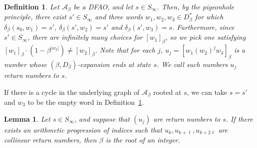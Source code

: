 \documentclass{amsart}
\newcommand{\Z}{\mathbb{Z}}
\newcommand{\tcr}{\textcolor{red}}
\newcommand{\ii}{\mathrm{i}}
\newtheorem*{main theorem}{Theorem \ref{thm:main-gaussian}}
\newtheorem{lemma}[theorem]{Lemma}
\newtheorem{definition}[theorem]{Definition}
\theoremstyle{definition}
\begin{document}
   \begin{definition}\label{def:return-number} Let $\mathcal A_\beta $ be a DFAO, and  let $s\in S_\infty$. Then, by the pigeonhole principle, there exist $s'\in S_\infty$ and three words $w_1,w_2,w_3\in D_\beta^*$ for which
    $\delta_\beta(s_0,w_1)=s'$,  $\delta_\beta(s',w_2)=s'$ and $\delta_\beta(s',w_3)=s$. 
    Furthermore, since $s'\in S_\infty$, there are infinitely many choices for  $[w_1]_\beta$, so we pick one satisfying   $[w_1]_\beta \cdot (1-\beta^{\lvert w_2\rvert}) \ne  [w_2]_\beta$. Note that for each $j$, $u_j=[w_1(w_2)^jw_3]_\beta$ is a number
      whose $(\beta, D_\beta)$-expansion ends at state $s$. 
    We  call such numbers 
      $u_j$ {\em return numbers to $s$}.\end{definition}

     If there is a cycle in the underlying graph of $\mathcal A_\beta$ rooted at $s$, we can take $s=s'$ and $w_3$ to be the empty word in Definition~\ref{def:return-number}.


\begin{lemma}\label{lem:non-collinearity-1}
    Let $s\in S_\infty$, and  suppose that $(u_j)$  are  return numbers to $s$.
      If there exists an  arithmetic progression of indices such that  $u_k,u_{k+\ell},u_{k+2\ell}$ are collinear return numbers, then $\beta$ is the root of an integer.
\end{lemma}
\end{document}
